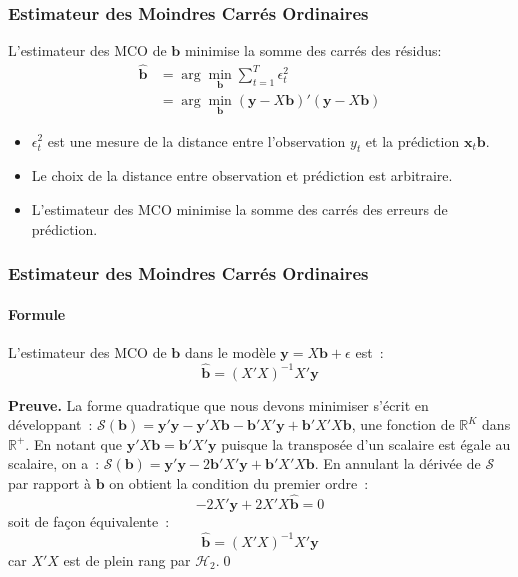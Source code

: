 \documentclass[10pt]{beamer}
\begin{document}
\begin{frame}
  \frametitle{Estimateur des Moindres Carrés Ordinaires}

\begin{defn}{}
  L'estimateur des MCO de $\mathbf b$ minimise la somme des carrés des résidus:
  \[
    \begin{split}
      \hat{\mathbf b} &= \arg\min_{\mathbf b} \sum_{t=1}^T \epsilon_t^2\\
      &= \arg\min_{\mathbf b} (\mathbf y-X \mathbf b)'(\mathbf y-X\mathbf b)
    \end{split}
  \]
\end{defn}

\bigskip

\begin{itemize}

\item $\epsilon_t^2$ est une mesure de la distance entre l'observation $y_t$ et la prédiction $\mathbf x_t\mathbf b$.\newline

\item Le choix de la distance entre observation et prédiction est
  arbitraire.\newline

\item L'estimateur des MCO minimise la somme des carrés des erreurs de prédiction.\newline

\end{itemize}

\end{frame}


\begin{frame}
  \frametitle{Estimateur des Moindres Carrés Ordinaires}
  \framesubtitle{Formule}

\begin{theorem}\label{thm:ols}
  L'estimateur des MCO de $\mathbf b$ dans le modèle $\mathbf y=X\mathbf b + \epsilon$ est~:
  \[
    \hat{\mathbf{b}} = \left( X'X \right)^{-1}X'\mathbf y
  \]
\end{theorem}


\bigskip

\textbf{Preuve.} \small{La forme quadratique que nous devons minimiser s'écrit en développant~: $\mathcal S(\mathbf b) = \mathbf y'\mathbf y-\mathbf y'X\mathbf b-\mathbf b'X'\mathbf y+\mathbf b'X'X\mathbf b$, une fonction de $\mathbb R^K$ dans $\mathbb R^+$. En notant que $\mathbf y'X\mathbf b = \mathbf b'X'\mathbf y$ puisque la transposée d'un scalaire est égale au scalaire, on a~: $\mathcal S(\mathbf b) = \mathbf y'\mathbf y-2\mathbf b'X'\mathbf y+\mathbf b'X'X\mathbf b$. En annulant la dérivée de $\mathcal S$ par rapport à $\mathbf b$ on obtient la condition du premier ordre~:
\[
-2X'\mathbf y + 2 X'X \hat{\mathbf b} = 0
\]
soit de façon équivalente~:
\[
\hat{\mathbf{b}} = \left( X'X \right)^{-1}X'\mathbf y
\]
car $X'X$ est de plein rang par $\mathcal H_2$.}\qed
\end{frame}
\end{document}
